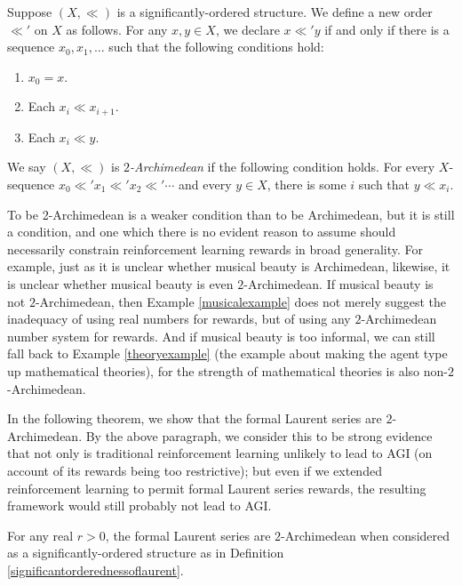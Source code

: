 \documentclass[twoside,11pt]{article}
\begin{document}
\begin{definition}
Suppose $(X,\ll)$ is a significantly-ordered structure.
We define a new order $\ll'$ on $X$ as follows.
For any $x,y\in X$, we declare $x\ll' y$ if and only if there is a sequence
$x_0,x_1,\ldots$ such that the following conditions hold:
\begin{enumerate}
    \item
    $x_0=x$.
    \item
    Each $x_i\ll x_{i+1}$.
    \item
    Each $x_i\ll y$.
\end{enumerate}
We say $(X,\ll)$ is \emph{$2$-Archimedean} if
the following condition holds.
For every $X$-sequence $x_0\ll' x_1\ll' x_2\ll' \cdots$
and every $y\in X$, there is some $i$
such that $y\ll x_i$.
\end{definition}

To be 2-Archimedean is a weaker condition than to be Archimedean, but it is
still a condition, and one which there is no evident reason to assume should
necessarily constrain reinforcement learning rewards in broad generality.
For example, just as it is unclear whether musical beauty is Archimedean,
likewise, it is unclear whether musical beauty is even $2$-Archimedean.
If musical beauty is not $2$-Archimedean,
then Example \ref{musicalexample} does not merely suggest the
inadequacy of using real numbers for rewards, but of using any $2$-Archimedean number
system for rewards. And if musical beauty is too informal,
we can still fall back to Example \ref{theoryexample}
(the example about making the agent type up mathematical theories),
for the strength of mathematical theories is also non-$2$-Archimedean.

In the following theorem, we show that the formal Laurent series are $2$-Archimedean.
By the above paragraph, we consider this to be strong evidence that not only is
traditional reinforcement learning unlikely to lead to AGI (on account of its rewards
being too restrictive); but even if we extended reinforcement learning to permit
formal Laurent series rewards, the resulting framework would still probably not lead
to AGI.

\begin{theorem}
\label{tedioustheorem}
For any real $r>0$,
the formal Laurent series are $2$-Archimedean when considered as a
significantly-ordered structure as in Definition \ref{significantorderednessoflaurent}.
\end{theorem}
\end{document}
